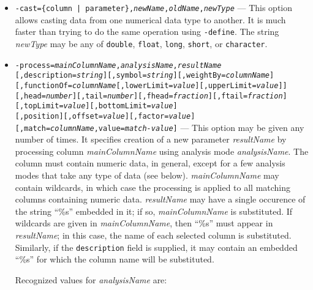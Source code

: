 \begin{itemize}
\begin{itemize}
\begin{itemize}
        \item {\tt -cast=\{column | parameter\},{\em newName},{\em oldName},{\em newType}} --- This option allows
casting data from one numerical data type to another.  It is much faster than trying to do the same operation using
{\tt -define}.  The string {\em newType} may be any of {\tt double}, {\tt float}, {\tt long}, {\tt short}, or
{\tt character}.

        \item {\tt -process={\em mainColumnName},{\em analysisName},{\em resultName}}
\\{\tt [,description={\em string}][,symbol={\em string}][,weightBy={\em columnName}]}
\\{\tt [,functionOf={\em columnName}[,lowerLimit={\em value}][,upperLimit={\em value}]]}
\\{\tt [,head={\em number}][,tail={\em number}][,fhead={\em fraction}][,ftail={\em fraction}]}
\\{\tt [,topLimit={\em value}][,bottomLimit={\em value}]} 
\\{\tt [,position][,offset={\em value}][,factor={\em value}]}
\\{\tt [,match={\em columnName},value={\em match-value}]} --- This option may be given
any number of times.  It specifies creation of a new parameter {\em resultName} by processing
column {\em mainColumnName} using analysis mode {\em analysisName}.  The column must contain
numeric data, in general, except for a few analysis modes that take any type of data (see below). {\em
mainColumnName} may contain wildcards, in which case the processing is applied to all matching
columns containing numeric data.  {\em resultName} may have a single occurence of the string
``\%s'' embedded in it; if so, {\em mainColumnName} is substituted.  If wildcards are given in
{\em mainColumnName}, then ``\%s'' must appear in {\em resultName}; in this case, the name of
each selected column is substituted.  Similarly, if the {\tt description} field is supplied,
it may contain an embedded ``\%s'' for which the column name will be substituted.

Recognized values for {\em analysisName} are:


\end{itemize}
\end{itemize}
\end{itemize}
